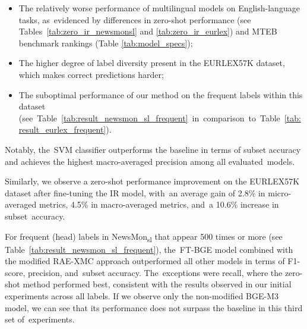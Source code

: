 \documentclass[make,article,accept,pdftex,moreauthors]{Definitions/mdpi}
\begin{document}
\begin{itemize}
    \item The relatively worse performance of multilingual models on English-language tasks, as~evidenced by differences in zero-shot performance (see Tables~\ref{tab:zero_ir_newsmonsl} and \ref{tab:zero_ir_eurlex}) and MTEB benchmark rankings (Table \ref{tab:model_specs});
    \item The higher degree of label diversity present in the EURLEX57K dataset, which makes correct predictions harder;
    \item The suboptimal performance of our method on the frequent labels within this dataset \mbox{(see Table~\ref{tab:result_newsmon_sl_frequent} in comparison to Table~\ref{tab:result_eurlex_frequent}).}
\end{itemize}

Notably, the~SVM classifier outperforms the baseline in terms of subset accuracy and achieves the highest macro-averaged precision among all evaluated~models.

Similarly, we observe a zero-shot performance improvement on the EURLEX57K dataset after fine-tuning the IR model, with~an average gain of 2.8\% in micro-averaged metrics, 4.5\% in macro-averaged metrics, and~a 10.6\% increase in subset~accuracy.


For frequent (head) labels in NewsMon\textsubscript{sl} that appear 500 times or more (see Table~\ref{tab:result_newsmon_sl_frequent}), the~FT-BGE model combined with the modified RAE-XMC approach outperformed all other models in terms of F1-score, precision, and~subset accuracy. The~exceptions were recall, where the zero-shot method performed best, consistent with the results observed in our initial experiments across all labels.
If we observe only the non-modified BGE-M3 model, we can see that its performance does not surpass the baseline in this third set of~experiments.
\end{document}
